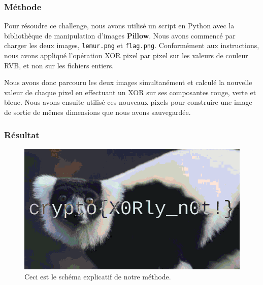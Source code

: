 \documentclass[12pt, a4paper]{article}
\begin{document}
        \subsubsection{Méthode}
        
        Pour résoudre ce challenge, nous avons utilisé un script en Python avec la bibliothèque de manipulation d'images \textbf{Pillow}. Nous avons commencé par charger les deux images, \texttt{lemur.png} et \texttt{flag.png}. Conformément aux instructions, nous avons appliqué l'opération XOR pixel par pixel sur les valeurs de couleur RVB, et non sur les fichiers entiers.
        
        Nous avons donc parcouru les deux images simultanément et calculé la nouvelle valeur de chaque pixel en effectuant un XOR sur ses composantes rouge, verte et bleue. Nous avons ensuite utilisé ces nouveaux pixels pour construire une image de sortie de mêmes dimensions que nous avons sauvegardée.
        
        \subsubsection{Résultat}
        
            \begin{figure}[H]
                \centering
                \includegraphics[width=0.8\linewidth]{Images/Lemur/xored_result.png}
                
                \caption{Ceci est le schéma explicatif de notre méthode.}
                
                \label{fig:encodeChallRes}
            \end{figure} 
        
\end{document}
